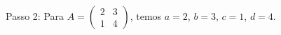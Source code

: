 \documentclass[preview]{standalone}
\begin{document}
\begin{center}
Passo 2: Para \( A = \begin{pmatrix} 2 & 3 \\ 1 & 4 \end{pmatrix} \), temos \( a = 2 \), \( b = 3 \), \( c = 1 \), \( d = 4 \).
\end{center}
\end{document}
